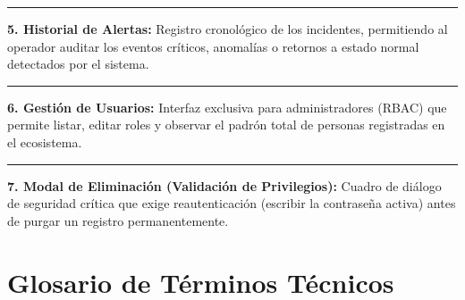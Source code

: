 \documentclass[11pt,a4paper]{article}
\begin{document}
\begin{center}
    \rule{6cm}{10cm}
\end{center}
\textbf{5. Historial de Alertas:} Registro cronológico de los incidentes, permitiendo al operador auditar los eventos críticos, anomalías o retornos a estado normal detectados por el sistema.
\vspace{1cm}

\begin{center}
    \rule{6cm}{10cm}
\end{center}
\textbf{6. Gestión de Usuarios:} Interfaz exclusiva para administradores (RBAC) que permite listar, editar roles y observar el padrón total de personas registradas en el ecosistema.
\newpage

\begin{center}
    \rule{6cm}{10cm}
\end{center}
\textbf{7. Modal de Eliminación (Validación de Privilegios):} Cuadro de diálogo de seguridad crítica que exige reautenticación (escribir la contraseña activa) antes de purgar un registro permanentemente.

\newpage
\section{Glosario de Términos Técnicos}
\end{document}
